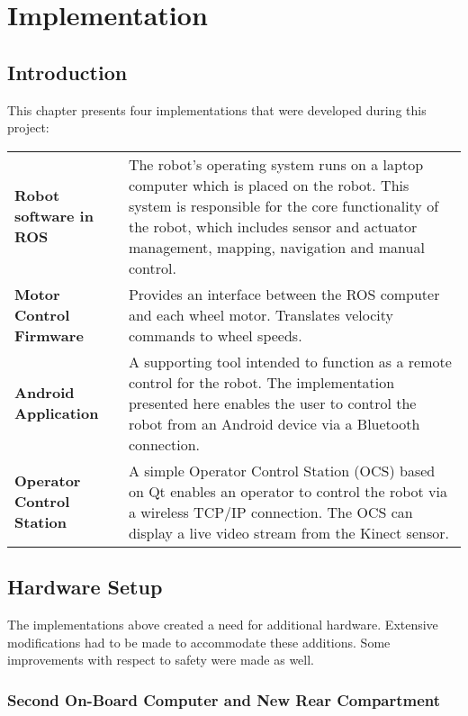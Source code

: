 \chapter{Implementation}
\label{chp:implementation} 

\section{Introduction}

This chapter presents four implementations that were developed during this project:

\begin{center}
	\begin{tabular}{ l p{7cm} }
	\textbf{Robot software in \ac{ROS}} & The robot's operating system runs on a laptop computer which is placed on the robot. This system is responsible for the core functionality of the robot, which includes sensor and actuator management, mapping, navigation and manual control.\\
	\textbf{Motor Control Firmware} & Provides an interface between the \ac{ROS} computer and each wheel motor. Translates velocity commands to wheel speeds.\\
	\textbf{Android Application} & A supporting tool intended to function as a remote control for the robot. The implementation presented here enables the user to control the robot from an Android device via a Bluetooth connection.\\
	\textbf{Operator Control Station} & A simple Operator Control Station (OCS) based on Qt enables an operator to control the robot via a wireless TCP/IP connection. The \ac{OCS} can display a live video stream from the Kinect sensor. \\
	\end{tabular}
\end{center}

\section{Hardware Setup}

The implementations above created a need for additional hardware. Extensive modifications had to be made to accommodate these additions. Some improvements with respect to safety were made as well.

\subsection{Second On-Board Computer and New Rear Compartment}

